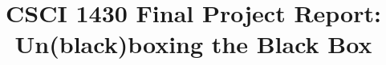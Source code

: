 %
%
%

%
%
%
%
% 
%
%
% 

\documentclass[10pt,twocolumn,letterpaper]{article}
 
\usepackage{cvpr}
\usepackage{times}
\usepackage{epsfig}
\usepackage{graphicx}
\usepackage{amsmath}
\usepackage{amssymb}
\usepackage{booktabs}
\usepackage{microtype}

\usepackage{float}
\usepackage[numbered,framed]{matlab-prettifier}

\frenchspacing


\usepackage[pagebackref=true,breaklinks=true,letterpaper=true,colorlinks,bookmarks=false]{hyperref}

\cvprfinalcopy
\def\cvprPaperID{****}
\def\httilde{\mbox{\tt\raisebox{-.5ex}{\symbol{126}}}}
\ifcvprfinal\pagestyle{empty}\fi



\title{CSCI 1430 Final Project Report:\\Un(black)boxing the Black Box}

